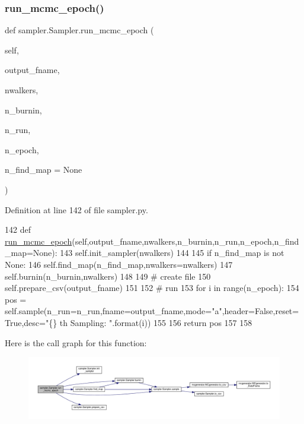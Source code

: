 \subsubsection{\texorpdfstring{run\+\_\+mcmc\+\_\+epoch()}{run\_mcmc\_epoch()}}
{\footnotesize\ttfamily def sampler.\+Sampler.\+run\+\_\+mcmc\+\_\+epoch (\begin{DoxyParamCaption}\item[{}]{self,  }\item[{}]{output\+\_\+fname,  }\item[{}]{nwalkers,  }\item[{}]{n\+\_\+burnin,  }\item[{}]{n\+\_\+run,  }\item[{}]{n\+\_\+epoch,  }\item[{}]{n\+\_\+find\+\_\+map = {\ttfamily None} }\end{DoxyParamCaption})}



Definition at line 142 of file sampler.\+py.


\begin{DoxyCode}
142     \textcolor{keyword}{def }\hyperlink{classsampler_1_1Sampler_a93e39e8143affeb3572fdf024bf2d12b}{run\_mcmc\_epoch}(self,output\_fname,nwalkers,n\_burnin,n\_run,n\_epoch,n\_find\_map=None):
143         self.init\_sampler(nwalkers)
144         
145         \textcolor{keywordflow}{if} n\_find\_map \textcolor{keywordflow}{is} \textcolor{keywordflow}{not} \textcolor{keywordtype}{None}:
146             self.find\_map(n\_find\_map,nwalkers=nwalkers)
147         self.burnin(n\_burnin,nwalkers)
148 
149         \textcolor{comment}{# create file}
150         self.prepare\_csv(output\_fname)
151         
152         \textcolor{comment}{# run}
153         \textcolor{keywordflow}{for} i \textcolor{keywordflow}{in} range(n\_epoch):
154             pos = self.sample(n\_run=n\_run,fname=output\_fname,mode=\textcolor{stringliteral}{"a"},header=\textcolor{keyword}{False},reset=\textcolor{keyword}{True},desc=\textcolor{stringliteral}{"\{\} th
       Sampling: "}.format(i))
155          
156         \textcolor{keywordflow}{return} pos
157 
158     
\end{DoxyCode}
Here is the call graph for this function\+:\nopagebreak
\begin{figure}[H]
\begin{center}
\leavevmode
\includegraphics[width=350pt]{d3/d8a/classsampler_1_1Sampler_a93e39e8143affeb3572fdf024bf2d12b_cgraph}
\end{center}
\end{figure}
\mbox{\label{classsampler_1_1Sampler_a9403aa08f08af30f703b7b507431d7a9}} 
